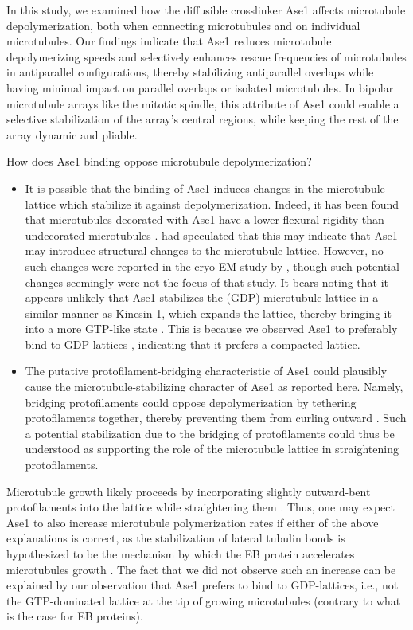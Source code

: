 In this study, we examined how the diffusible  crosslinker Ase1 affects microtubule depolymerization, both when connecting microtubules and on individual microtubules. Our findings indicate that Ase1 reduces microtubule depolymerizing speeds and selectively enhances rescue frequencies of microtubules in antiparallel configurations, thereby stabilizing antiparallel overlaps while having minimal impact on parallel overlaps or isolated microtubules. In bipolar microtubule arrays like the mitotic spindle, this attribute of Ase1 could enable a selective stabilization of the array's central regions, while keeping the rest of the array dynamic and pliable.\par

How does Ase1 binding oppose microtubule depolymerization? 

\begin{itemize}
    \item It is possible that the binding of Ase1 induces changes in the microtubule lattice which stabilize it against depolymerization. Indeed, it has been found that microtubules decorated with Ase1 have a lower flexural rigidity than undecorated microtubules \parencite{Portran2013}. \cite{Portran2013} had speculated that this may indicate that Ase1 may introduce structural changes to the microtubule lattice. However, no such changes were reported in the cryo-EM study by \cite{Kellogg2016}, though such potential changes seemingly were not the focus of that study. It bears noting that it appears unlikely that Ase1 stabilizes the (GDP) microtubule lattice in a similar manner as Kinesin-1, which expands the lattice, thereby bringing it into a more GTP-like state \parencite{Peet2018}. This is because we observed Ase1 to preferably bind to GDP-lattices , indicating that it prefers a compacted lattice.
    \item The putative protofilament-bridging characteristic of Ase1  could plausibly cause the microtubule-stabilizing character of Ase1 as reported here. Namely, bridging protofilaments could oppose depolymerization by tethering protofilaments together, thereby preventing them from curling outward . Such a potential stabilization due to the bridging of protofilaments could thus be understood as supporting the role of the microtubule lattice in straightening protofilaments.
\end{itemize}
Microtubule growth likely proceeds by incorporating slightly outward-bent protofilaments into the lattice while straightening them . Thus, one may expect Ase1 to also increase microtubule polymerization rates if either of the above explanations is correct, as the stabilization of lateral tubulin bonds is hypothesized to be the mechanism by which the EB protein accelerates microtubules growth . The fact that we did not observe such an increase can be explained by our observation that Ase1 prefers to bind to GDP-lattices, i.e., not the GTP-dominated lattice at the tip of growing microtubules (contrary to what is the case for EB proteins).

